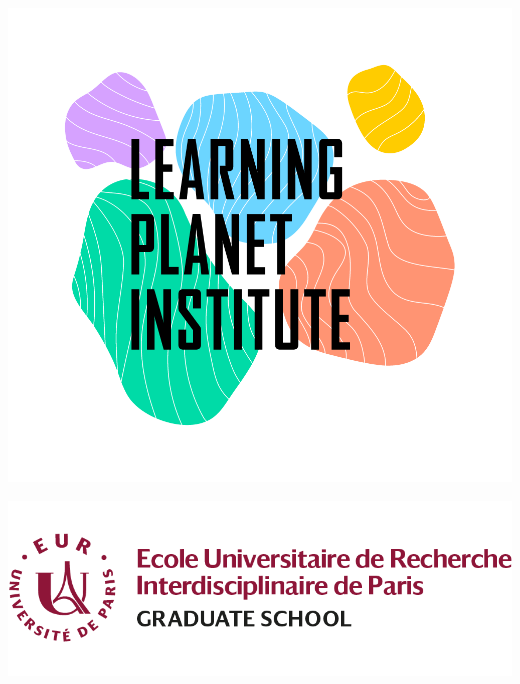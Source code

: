 \documentclass[11pt,a4paper]{article}
\begin{document}
\begin{titlepage}
\begin{minipage}{0.25\textwidth}
        \includegraphics[width=\linewidth]{Logos/Copie de LPI_LOGO_RVB.png}\par\vspace{1cm}
    \end{minipage}
    \begin{minipage}{0.25\textwidth}
        \includegraphics[width=\linewidth]{Logos/EURIP logo.png}\par\vspace{1cm}

\end{minipage}
\end{titlepage}
\end{document}
